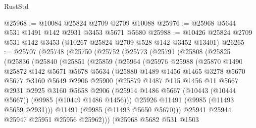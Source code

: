 \begin{lexlean}{RustStd}
\begin{coremodule}
@25968 := @10084 @25824 @2709 @2709 @10088
@25976 := @25968 @5644 @531 @1491 @142 @2931 @3453 @5671 @5680
@25988 := @10426 @25824 @2709 @531 @142 @3453 (@10267 @25824 @2709 @528 @142 @3452 @13401)
@26265 := @25707
    (@25748
      (@25750
        (@25752
          (@25773
            (@25791
              (@25808
                (@25825
                  (@25836
                    (@25840
                      (@25851
                        (@25859
                          (@25964
                            (@25976
                              @25988
                              (@25870
                                @1490
                                @25872
                                @142
                                @5671
                                @5678
                                @5634
                                (@25880
                                  @1489
                                  @1456
                                  @1465
                                  @3278
                                  @5670
                                  @5677
                                  @3160
                                  @5649
                                  @2906
                                  @25900
                                  (@25879
                                    @1487
                                    @115
                                    @1456
                                    @11
                                    @5667
                                    @2931
                                    @2925
                                    @3160
                                    @5658
                                    @2906
                                    (@25914
                                      @1486
                                      @5667
                                      (@10443 (@10444 @5667))
                                      (@9985 (@10449 @1486 @1456)))
                                    @25926
                                    @11491
                                    (@9985 (@11493 @5659 @2931)))
                                  @11491
                                  (@9985 (@11493 @5650 @5670)))
                                @25941
                                @25944
                                @25947
                                @25951
                                @25956
                                @25962)))
                          (@25968
                            @5682
                            @531
                            @1503

\end{coremodule}
\end{lexlean}
